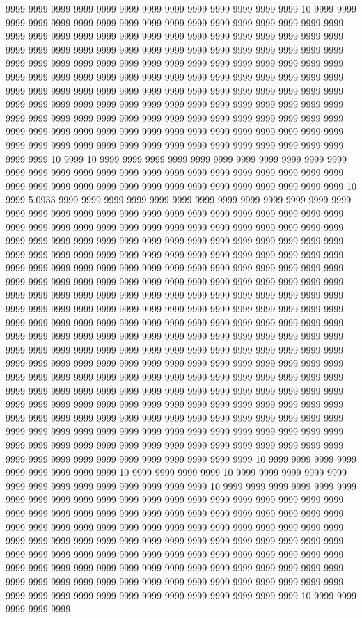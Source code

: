 9999 9999 9999 9999 9999 9999 9999 9999 9999 9999 9999 9999 9999 10 9999 9999 9999 9999 9999 9999 9999 9999 9999 9999 9999 9999 9999 9999 9999 9999 9999 9999 9999 9999 9999 9999 9999 9999 9999 9999 9999 9999 9999 9999 9999 9999 9999 9999 9999 9999 9999 9999 9999 9999 9999 9999 9999 9999 9999 9999 9999 9999 9999 9999 9999 9999 9999 9999 9999 9999 9999 9999 9999 9999 9999 9999 9999 9999 9999 9999 9999 9999 9999 9999 9999 9999 9999 9999 9999 9999 9999 9999 9999 9999 9999 9999 9999 9999 9999 9999 9999 9999 9999 9999 9999 9999 9999 9999 9999 9999 9999 9999 9999 9999 9999 9999 9999 9999 9999 9999 9999 9999 9999 9999 9999 9999 9999 9999 9999 9999 9999 9999 9999 9999 9999 9999 9999 9999 9999 9999 9999 9999 9999 9999 9999 9999 9999 9999 9999 9999 9999 9999 9999 9999 9999 9999 9999 9999 9999 9999 9999 9999 9999 9999 9999 9999 9999 9999 10 9999 10 9999 9999 9999 9999 9999 9999 9999 9999 9999 9999 9999 9999 9999 9999 9999 9999 9999 9999 9999 9999 9999 9999 9999 9999 9999 9999 9999 9999 9999 9999 9999 9999 9999 9999 9999 9999 9999 9999 9999 9999 9999 10 9999 5.0933 9999 9999 9999 9999 9999 9999 9999 9999 9999 9999 9999 9999 9999 9999 9999 9999 9999 9999 9999 9999 9999 9999 9999 9999 9999 9999 9999 9999 9999 9999 9999 9999 9999 9999 9999 9999 9999 9999 9999 9999 9999 9999 9999 9999 9999 9999 9999 9999 9999 9999 9999 9999 9999 9999 9999 9999 9999 9999 9999 9999 9999 9999 9999 9999 9999 9999 9999 9999 9999 9999 9999 9999 9999 9999 9999 9999 9999 9999 9999 9999 9999 9999 9999 9999 9999 9999 9999 9999 9999 9999 9999 9999 9999 9999 9999 9999 9999 9999 9999 9999 9999 9999 9999 9999 9999 9999 9999 9999 9999 9999 9999 9999 9999 9999 9999 9999 9999 9999 9999 9999 9999 9999 9999 9999 9999 9999 9999 9999 9999 9999 9999 9999 9999 9999 9999 9999 9999 9999 9999 9999 9999 9999 9999 9999 9999 9999 9999 9999 9999 9999 9999 9999 9999 9999 9999 9999 9999 9999 9999 9999 9999 9999 9999 9999 9999 9999 9999 9999 9999 9999 9999 9999 9999 9999 9999 9999 9999 9999 9999 9999 9999 9999 9999 9999 9999 9999 9999 9999 9999 9999 9999 9999 9999 9999 9999 9999 9999 9999 9999 9999 9999 9999 9999 9999 9999 9999 9999 9999 9999 9999 9999 9999 9999 9999 9999 9999 9999 9999 9999 9999 9999 9999 9999 9999 9999 9999 9999 9999 9999 9999 9999 9999 9999 9999 9999 9999 9999 9999 9999 9999 9999 9999 9999 9999 9999 9999 9999 9999 9999 9999 9999 9999 9999 9999 9999 9999 9999 9999 9999 9999 9999 9999 9999 9999 9999 9999 9999 9999 9999 9999 9999 9999 9999 9999 9999 9999 9999 9999 9999 9999 9999 9999 9999 9999 9999 9999 9999 9999 9999 9999 9999 9999 9999 9999 10 9999 9999 9999 9999 9999 9999 9999 9999 9999 10 9999 9999 9999 9999 10 9999 9999 9999 9999 9999 9999 9999 9999 9999 9999 9999 9999 9999 9999 10 9999 9999 9999 9999 9999 9999 9999 9999 9999 9999 9999 9999 9999 9999 9999 9999 9999 9999 9999 9999 9999 9999 9999 9999 9999 9999 9999 9999 9999 9999 9999 9999 9999 9999 9999 9999 9999 9999 9999 9999 9999 9999 9999 9999 9999 9999 9999 9999 9999 9999 9999 9999 9999 9999 9999 9999 9999 9999 9999 9999 9999 9999 9999 9999 9999 9999 9999 9999 9999 9999 9999 9999 9999 9999 9999 9999 9999 9999 9999 9999 9999 9999 9999 9999 9999 9999 9999 9999 9999 9999 9999 9999 9999 9999 9999 9999 9999 9999 9999 9999 9999 9999 9999 9999 9999 9999 9999 9999 9999 9999 9999 9999 9999 9999 9999 9999 9999 9999 9999 9999 9999 9999 9999 9999 10 9999 9999 9999 9999 9999 